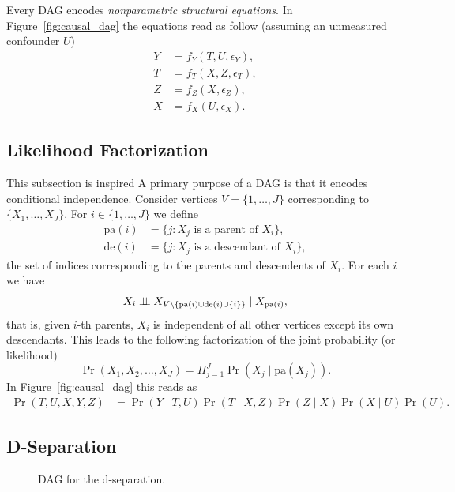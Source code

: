 \documentclass[11pt]{exam}
\begin{document}
Every DAG encodes \emph{nonparametric structural equations}. In Figure~\ref{fig:causal_dag} the equations read as follow (assuming an unmeasured confounder $U$)
\begin{align*}
    Y &= f_Y(T, U, \epsilon_Y),
    \\
    T&= f_T(X, Z, \epsilon_T),
    \\
    Z &= f_Z(X, \epsilon_Z),
    \\
    X &= f_X(U, \epsilon_X).
\end{align*}

\subsection{Likelihood Factorization}
This subsection is inspired
A primary purpose of a DAG is that it encodes conditional independence. Consider vertices $V = \{1, \ldots, J\}$ corresponding to $\{X_1, \ldots, X_J\}$. For $i \in \{1, \ldots, J\}$ we define
\begin{align*}
    \mathrm{pa}(i) &= \{j: X_j \text{ is a parent of } X_i\},
    \\
    \mathrm{de}(i) &= \{j: X_j \text{ is a descendant of } X_i\},
\end{align*}
the set of indices corresponding to the parents and descendents of $X_i$. For each $i$ we have
\[
    X_i \perp\!\!\!\perp X_{V \setminus \{\mathrm{pa}(i) \cup \mathrm{de}(i) \cup \{i\}\}} \mid  X_{{\mathrm{pa}(i)}} ,
\]
that is, given $i$-th parents, $X_i$ is independent of all other vertices except its own descendants. This leads to the following factorization of the joint probability (or likelihood)
\[
    \Pr(X_1, X_2, \ldots, X_J) = \Pi_{j=1}^J \Pr(X_j \mid \text{pa}(X_j)).
\]
In Figure~\ref{fig:causal_dag} this reads as
\begin{align*}
     \Pr(T, U, X, Y, Z) &= \Pr(Y \mid T, U) \Pr(T \mid X, Z) \Pr(Z \mid X) \Pr(X \mid U) \Pr(U).
\end{align*}


\subsection{D-Separation}
\begin{figure}[h!]
\centering
{}
\caption{DAG for the d-separation.}
\label{fig:dsep-example}
\end{figure}
\end{document}

